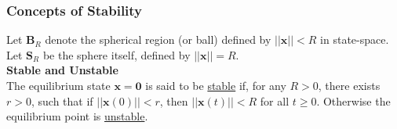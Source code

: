 \documentclass[11pt,handout]{beamer}   %
\begin{document}

\begin{frame}
\frametitle{Concepts of Stability}
Let $\mathbf{B}_R$ denote the spherical region (or ball) defined by $|| \mathbf{x}||<R$ in state-space.\\
\vspace{6pt}
Let $\mathbf{S}_R$ be the sphere itself, defined by $|| \mathbf{x} || = R$.\\
\vspace{6pt}
\textbf{Stable and Unstable}\\
The equilibrium state $\mathbf{x}= \mathbf{0}$ is said to be \underline{stable} if, for any $R>0$, there exists $r>0$, such that if $||\mathbf{x}(0)||<r$, then $||\mathbf{x}(t)||<R$ for all $t \geq 0$. Otherwise the equilibrium point is \underline{unstable}.
\end{frame}
\end{document}
